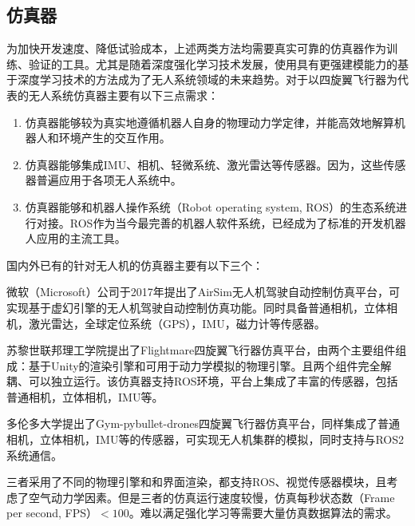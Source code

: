 \subsection{仿真器}
为加快开发速度、降低试验成本，上述两类方法均需要真实可靠的仿真器作为训练、验证的工具。尤其是随着深度强化学习技术发展，使用具有更强建模能力的基于深度学习技术的方法成为了无人系统领域的未来趋势。对于以四旋翼飞行器为代表的无人系统仿真器主要有以下三点需求：
\begin{enumerate}
  \item 仿真器能够较为真实地遵循机器人自身的物理动力学定律，并能高效地解算机器人和环境产生的交互作用。
  \item 仿真器能够集成IMU、相机、轻微系统、激光雷达等传感器。因为，这些传感器普遍应用于各项无人系统中。
  \item 仿真器能够和机器人操作系统（Robot operating system, ROS）的生态系统进行对接。ROS作为当今最完善的机器人软件系统，已经成为了标准的开发机器人应用的主流工具。
\end{enumerate}
国内外已有的针对无人机的仿真器主要有以下三个：

微软（Microsoft）公司于2017年提出了AirSim无人机驾驶自动控制仿真平台\cite{airsim2017}，可实现基于虚幻引擎的无人机驾驶自动控制仿真功能。同时具备普通相机，立体相机，激光雷达，全球定位系统（GPS），IMU，磁力计等传感器。

苏黎世联邦理工学院提出了Flightmare四旋翼飞行器仿真平台\cite{flightmare}，由两个主要组件组成：基于Unity的渲染引擎和可用于动力学模拟的物理引擎。且两个组件完全解耦、可以独立运行。该仿真器支持ROS环境，平台上集成了丰富的传感器，包括普通相机，立体相机，IMU等。

多伦多大学提出了Gym-pybullet-drones四旋翼飞行器仿真平台\cite{pybullet}，同样集成了普通相机，立体相机，IMU等的传感器，可实现无人机集群的模拟，同时支持与ROS2系统通信。

三者采用了不同的物理引擎和和界面渲染，都支持ROS、视觉传感器模块，且考虑了空气动力学因素。但是三者的仿真运行速度较慢，仿真每秒状态数（Frame per second, FPS）$<100$。难以满足强化学习等需要大量仿真数据算法的需求。

